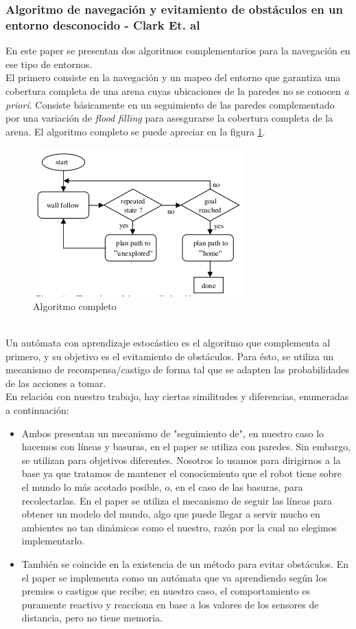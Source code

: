 \subsubsection{Algoritmo de navegaci\'on y evitamiento de obst\'aculos en un
entorno desconocido - Clark Et. al \cite{clark}}
En este paper se presentan dos algoritmos complementarios para la navegaci\'on
en ese tipo de entornos.
\\
El primero consiste en la navegaci\'on y un mapeo del entorno que garantiza una
cobertura completa de una arena cuyas ubicaciones de la paredes no se conocen
\emph{a priori}. Consiste b\'asicamente en un seguimiento de las paredes
complementado por una variaci\'on de \emph{flood filling} para asesgurarse la
cobertura completa de la arena. El algoritmo completo se puede apreciar en la
figura \ref{fig:clark}.
\begin{figure}[htp]
\begin{center}
\includegraphics[scale=0.8]{comportamientos/clarkDiagram.png}
\caption{Algoritmo completo}
\label{fig:clark}
\end{center}
\end{figure}
\\
Un aut\'omata con aprendizaje estoc\'astico es el algoritmo que complementa al
primero, y su objetivo es el evitamiento de obst\'aculos. Para \'esto, se
utiliza un mecanismo de recompensa/castigo de forma tal que se adapten las
probabilidades de las acciones a tomar.
\\
En relaci\'on con nuestro trabajo, hay ciertas similitudes y diferencias,
enumeradas a continuaci\'on:
\begin{itemize}
\item{}Ambos presentan un mecanismo de "seguimiento de", en nuestro caso lo
hacemos con l\'ineas y basuras, en el paper se utiliza con paredes. Sin embargo,
se utilizan para objetivos diferentes. Nosotros lo usamos para dirigirnos a la
base ya que tratamos de mantener el conociemiento que el robot tiene sobre el
mundo lo m\'as acotado posible, o, en el caso de las basuras, para
recolectarlas. En el paper se utiliza el mecanismo de seguir las l\'ineas para
obtener un modelo del mundo, algo que puede llegar a servir mucho en ambientes
no tan din\'amicos como el nuestro, raz\'on por la cual no elegimos
implementarlo.
\item{}Tambi\'en se coincide en la existencia de un m\'etodo para evitar
obst\'aculos. En el paper se implementa como un aut\'omata que va aprendiendo
seg\'un los premios o castigos que recibe; en nuestro caso, el comportamiento
es puramente reactivo y reacciona en base a los valores de los sensores de
distancia, pero no tiene memoria.
\end{itemize}

